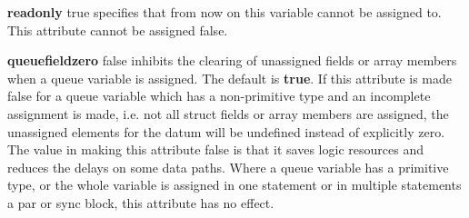         {\bf readonly} true specifies that from now on this variable cannot
        be assigned to. This attribute cannot be assigned false.
        
        {\bf queuefieldzero} false inhibits the clearing of unassigned fields or
        array members when a queue variable is assigned. The default is {\bf true}.
        If this attribute is made false for a queue variable which has a
        non-primitive type and an incomplete assignment is made, i.e. not all
        struct fields or array members are assigned, the unassigned elements
        for the datum will be undefined instead of explicitly zero. The value
        in making this attribute false is that it saves logic resources and
        reduces the delays on some data paths. Where a queue variable has a primitive
        type, or the whole variable is assigned in one statement or in multiple statements
        a par or sync block, this attribute has no effect.
